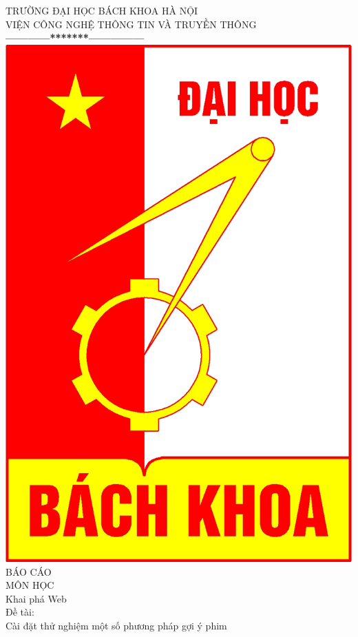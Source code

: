 \documentclass[a4paper,10pt]{report}
\begin{document}
\thispagestyle{empty}
\thisfancypage{
\setlength{\fboxrule}{1pt}
\doublebox}{}
\begin{center}
{\fontsize{16}{19}\selectfont TRƯỜNG ĐẠI HỌC BÁCH KHOA HÀ NỘI\\
VIỆN CÔNG NGHỆ THÔNG TIN VÀ TRUYỀN THÔNG}\\
\textbf{------------*******---------------}\\[1cm]
\includegraphics[scale=0.13]{hust.jpg}\\[1.3cm]

{\fontsize{32}{43}\selectfont BÁO CÁO}\\[0.1cm]
{\fontsize{38}{45}\selectfont MÔN HỌC}\\[0.2cm]
{\fontsize{19}{20}\selectfont Khai phá Web}\\[1cm]
{\fontsize{17}{24}\selectfont Đề tài:}\\[1cm]
{\fontsize{17}{24}\selectfont Cài đặt thử nghiệm một số phương pháp gợi ý phim }\\[2cm]
\end{center}
\end{document}
